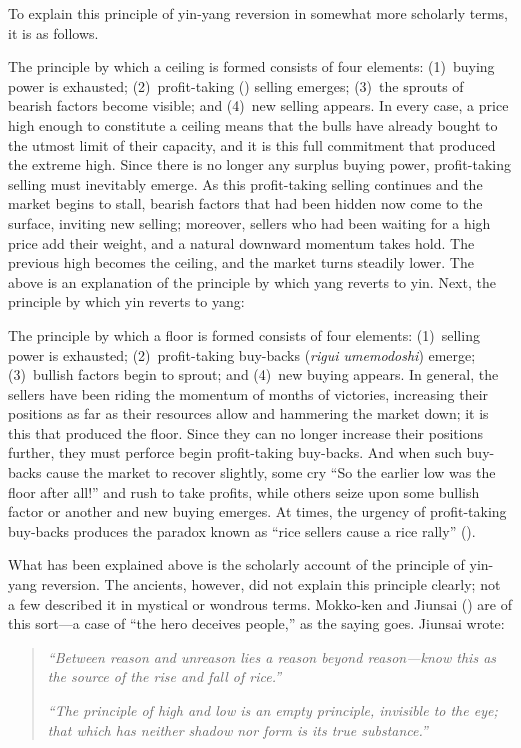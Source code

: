 To explain this principle of yin-yang reversion in somewhat more
scholarly terms, it is as follows.

The principle by which a ceiling is formed consists of four elements:
(1)~buying power is exhausted; (2)~profit-taking ()
selling emerges; (3)~the sprouts of bearish factors become visible; and
(4)~new selling appears. In every case, a price high enough to
constitute a ceiling means that the bulls have already bought to the
utmost limit of their capacity, and it is this full commitment that
produced the extreme high. Since there is no longer any surplus buying
power, profit-taking selling must inevitably emerge. As this
profit-taking selling continues and the market begins to stall, bearish
factors that had been hidden now come to the surface, inviting new
selling; moreover, sellers who had been waiting for a high price add
their weight, and a natural downward momentum takes hold. The previous
high becomes the ceiling, and the market turns steadily lower. The above
is an explanation of the principle by which yang reverts to yin. Next,
the principle by which yin reverts to yang:

The principle by which a floor is formed consists of four elements:
(1)~selling power is exhausted; (2)~profit-taking buy-backs
(\textit{rigui umemodoshi}) emerge; (3)~bullish factors begin to
sprout; and (4)~new buying appears. In general, the sellers have been
riding the momentum of months of victories, increasing their positions
as far as their resources allow and hammering the market down; it is
this that produced the floor. Since they can no longer increase their
positions further, they must perforce begin profit-taking buy-backs. And
when such buy-backs cause the market to recover slightly, some cry ``So
the earlier low was the floor after all!'' and rush to take profits,
while others seize upon some bullish factor or another and new buying
emerges. At times, the urgency of profit-taking buy-backs produces the
paradox known as ``rice sellers cause a rice rally''
().

What has been explained above is the scholarly account of the principle
of yin-yang reversion. The ancients, however, did not explain this
principle clearly; not a few described it in mystical or wondrous terms.
Mokko-ken and Jiunsai () are of this sort---a case of ``the
hero deceives people,'' as the saying goes. Jiunsai wrote:

\begin{quote}
\textit{``Between reason and unreason lies a reason beyond reason---know
this as the source of the rise and fall of rice.''}

\textit{``The principle of high and low is an empty principle, invisible
to the eye; that which has neither shadow nor form is its true
substance.''}
\end{quote}


